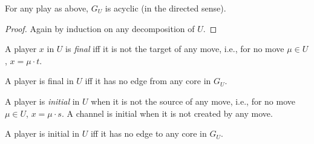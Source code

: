 \documentclass{LMCS}
\theoremstyle{plain}\newtheorem{satz}[thm]{Satz}
\begin{document}
 \begin{prop}
   For any play as above, $G_U$ is acyclic (in the directed sense).
 \end{prop}
 \begin{proof}
   Again by induction on any decomposition of $U$.
 \end{proof}

 \begin{defi}
   A player $x$ in $U$ is \emph{final} iff it is not the target of any move, i.e., for no move $\mu \in U$, $x = \mu \cdot t$.
 \end{defi}
 \begin{lem}
   A player is final in $U$ iff it has no edge from any core in $G_U$.
 \end{lem}
 \begin{defi}
   A player is \emph{initial} in $U$ when it is not the source of any
   move, i.e., for no move $\mu \in U$, $x = \mu \cdot s$. A channel
   is initial when it is not created by any move.
 \end{defi}
 \begin{lem}
   A player is initial in $U$ iff it has no edge to any core in $G_U$.
 \end{lem}
\end{document}
